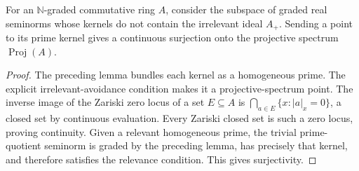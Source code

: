 \begin{theorem}
\label{spectrum:relevant-graded-support}
\leanok
{}
For an $\mathbb N$-graded commutative ring $A$, consider the subspace of
graded real seminorms whose kernels do not contain the irrelevant ideal
$A_+$. Sending a point to its prime kernel gives a continuous surjection
onto the projective spectrum $\operatorname{Proj}(A)$.
\end{theorem}
\begin{proof}
The preceding lemma bundles each kernel as a homogeneous prime. The
explicit irrelevant-avoidance condition makes it a projective-spectrum point.
The inverse image of the Zariski zero locus of a set $E\subseteq A$ is
$\bigcap_{a\in E}\{x:|a|_x=0\}$, a closed set by continuous evaluation.
Every Zariski closed set is such a zero locus, proving continuity.
Given a relevant homogeneous prime, the trivial prime-quotient seminorm
is graded by the preceding lemma, has precisely that kernel, and therefore
satisfies the relevance condition. This gives surjectivity.
\end{proof}

